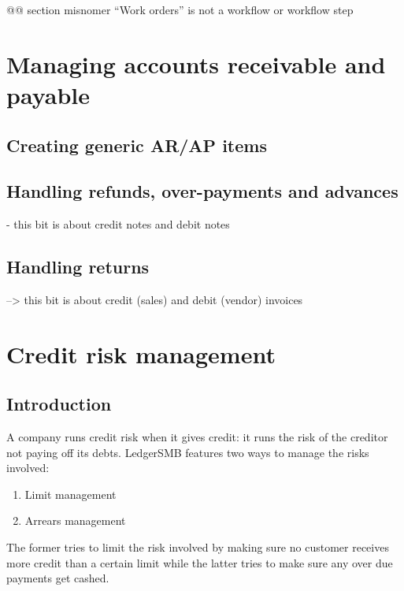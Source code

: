 @@ section misnomer ``Work orders'' is not a workflow or workflow step

\chapter{Managing accounts receivable and payable}
\label{cha-business-processes-managing-ar/ap}

\section{Creating generic AR/AP items}
\label{sec-business-processes-managing-ar/ap-item-creation}

\section{Handling refunds, over-payments and advances}
\label{sec-business-processes-managing-ar/ap-overpayments}

- this bit is about credit notes and debit notes

\section{Handling returns}
\label{sec-business-processes-managing-ar/ap-returns}

--> this bit is about credit (sales) and debit (vendor) invoices

\chapter{Credit risk management}
\label{cha-credit-risk-management}

\section{Introduction}
\label{sec-credit-risk-management-introduction}

A company runs credit risk when it gives credit: it runs the risk of the
creditor not paying off its debts.  LedgerSMB features two ways to manage
the risks involved:

\begin{enumerate}
\item Limit management
\item Arrears management
\end{enumerate}

The former tries to limit the risk involved by making sure no \gls{customer}
receives more credit than a certain limit while the latter tries to
make sure any over due payments get cashed.

